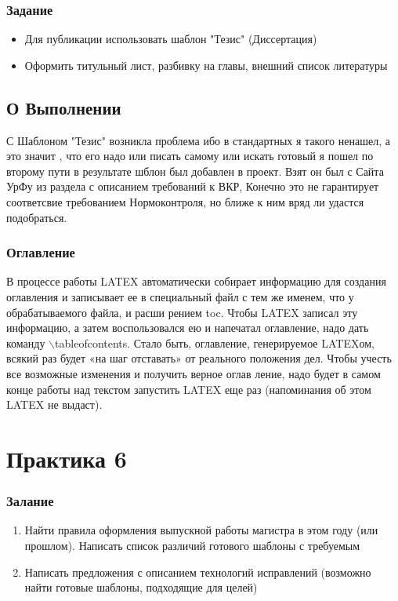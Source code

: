 \documentclass[a4paper,14pt,oneside]{book}
\theoremstyle{plain} %
\theoremstyle{definition} %
\theoremstyle{remark} %
\begin{document}
\subsection{Задание}

\begin{itemize}
\item Для публикации использовать шаблон "Тезис" (Диссертация) 
\item Оформить титульный лист, разбивку на главы, внешний список литературы 
\end{itemize}

\section{О Выполнении}
С Шаблоном "Тезис" возникла проблема ибо в стандартных я такого ненашел, а это значит , что его надо или писать самому или искать готовый я пошел по второму пути
в результате шблон был добавлен в проект. Взят он был  с Сайта УрФу из раздела с описанием требований к ВКР, Конечно это не гарантирует соответсвие требованием Нормоконтроля, но ближе к ним вряд ли удастся подобраться.

\subsection{Оглавление}
В процессе работы LATEX автоматически собирает информацию для создания оглавления и
записывает ее в специальный файл с тем же именем, что у обрабатываемого файла, и расши
рением toc. Чтобы LATEX записал эту информацию, а затем воспользовался ею и напечатал
оглавление, надо дать команду $\backslash$tableofcontents.
Стало быть, оглавление, генерируемое LATEXом, всякий раз будет «на шаг отставать» от
реального положения дел. Чтобы учесть все возможные изменения и получить верное оглав
ление, надо будет в самом конце работы над текстом запустить LATEX еще раз (напоминания
об этом LATEX не выдаст).

\chapter{Практика 6}
\subsection{Залание}
\begin{enumerate}
\item Найти правила оформления выпускной работы магистра в этом году (или прошлом). Написать список различий готового шаблоны с требуемым 
\item  Написать предложения с описанием технологий исправлений (возможно найти готовые шаблоны, подходящие для целей)
\end{enumerate}
\end{document}
